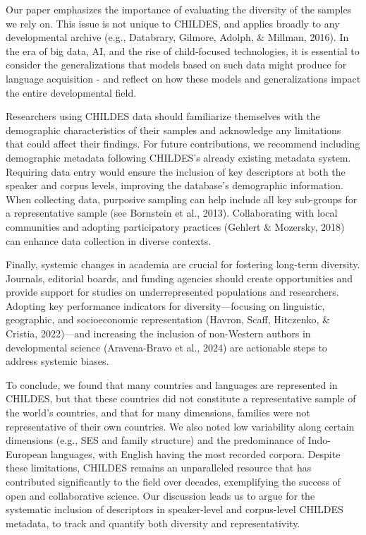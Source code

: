 \documentclass[
  man,floatsintext]{apa6}
\begin{document}
Our paper emphasizes the importance of evaluating the diversity of the samples we rely on. This issue is not unique to CHILDES, and applies broadly to any developmental archive (e.g., Databrary, Gilmore, Adolph, \& Millman, 2016). In the era of big data, AI, and the rise of child-focused technologies, it is essential to consider the generalizations that models based on such data might produce for language acquisition - and reflect on how these models and generalizations impact the entire developmental field.

Researchers using CHILDES data should familiarize themselves with the demographic characteristics of their samples and acknowledge any limitations that could affect their findings. For future contributions, we recommend including demographic metadata following CHILDES's already existing metadata system. Requiring data entry would ensure the inclusion of key descriptors at both the speaker and corpus levels, improving the database's demographic information. When collecting data, purposive sampling can help include all key sub-groups for a representative sample (see Bornstein et al., 2013). Collaborating with local communities and adopting participatory practices (Gehlert \& Mozersky, 2018) can enhance data collection in diverse contexts.

Finally, systemic changes in academia are crucial for fostering long-term diversity. Journals, editorial boards, and funding agencies should create opportunities and provide support for studies on underrepresented populations and researchers. Adopting key performance indicators for diversity---focusing on linguistic, geographic, and socioeconomic representation (Havron, Scaff, Hitczenko, \& Cristia, 2022)---and increasing the inclusion of non-Western authors in developmental science (Aravena-Bravo et al., 2024) are actionable steps to address systemic biases.

To conclude, we found that many countries and languages are represented in CHILDES, but that these countries did not constitute a representative sample of the world's countries, and that for many dimensions, families were not representative of their own countries. We also noted low variability along certain dimensions (e.g., SES and family structure) and the predominance of Indo-European languages, with English having the most recorded corpora. Despite these limitations, CHILDES remains an unparalleled resource that has contributed significantly to the field over decades, exemplifying the success of open and collaborative science. Our discussion leads us to argue for the systematic inclusion of descriptors in speaker-level and corpus-level CHILDES metadata, to track and quantify both diversity and representativity.
\end{document}
